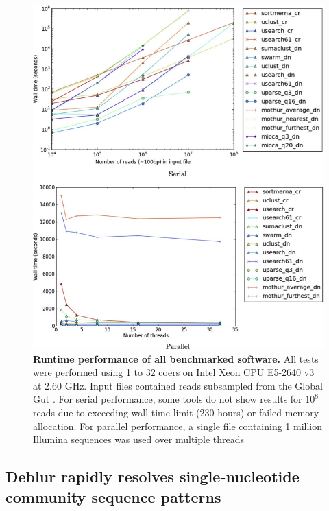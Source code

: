 \begin{figure}[htbp]
\begin{center}
\includegraphics[height=0.55\textheight]{chapter_otupicking_figures/stateArtF5.png}
\end{center}
\caption[Runtime performance of all benchmarked software]{\textbf{Runtime performance of all benchmarked software.}
All tests were performed using 1 to 32 coers on Intel Xeon CPU E5-2640 v3 at 2.60 GHz.
Input files contained reads subsampled from the Global Gut \cite{Yatsunenko2012}.
For serial performance, some tools do not show results for $10^8$ reads due to
exceeding wall time limit (230 hours) or failed memory allocation. For parallel performance,
a single file containing 1 million Illumina sequences was used over multiple threads}
\label{stateArtF5}
\end{figure}

\subsection{Deblur rapidly resolves single-nucleotide community sequence patterns}\label{subsection_deblur}

